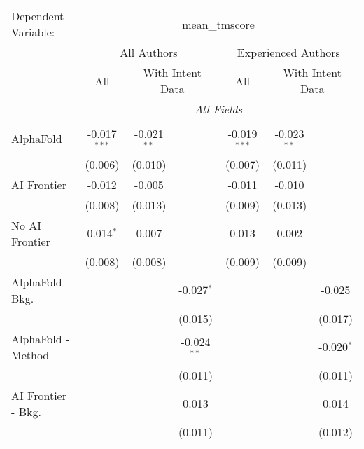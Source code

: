 \begingroup
\centering
\begin{tabular}{lcccccc}
   \tabularnewline \midrule \midrule
   Dependent Variable: & \multicolumn{6}{c}{mean\_tmscore}\\
 & \multicolumn{3}{c}{All Authors} & \multicolumn{3}{c}{Experienced Authors} \\
\cmidrule(lr){2-4} \cmidrule(lr){5-7}
 & \multicolumn{1}{c}{All} & \multicolumn{2}{c}{With Intent Data} & \multicolumn{1}{c}{All} & \multicolumn{2}{c}{With Intent Data} \\
\cmidrule(lr){2-2} \cmidrule(lr){3-4} \cmidrule(lr){5-5} \cmidrule(lr){6-7}
 & \multicolumn{6}{c}{\textit{All Fields}} \\ \\
   AlphaFold               & -0.017$^{***}$ & -0.021$^{**}$ &               & -0.019$^{***}$ & -0.023$^{**}$ &   \\   
                           & (0.006)        & (0.010)       &               & (0.007)        & (0.011)       &   \\   
   AI Frontier             & -0.012         & -0.005        &               & -0.011         & -0.010        &   \\   
                           & (0.008)        & (0.013)       &               & (0.009)        & (0.013)       &   \\   
   No AI Frontier          & 0.014$^{*}$    & 0.007         &               & 0.013          & 0.002         &   \\   
                           & (0.008)        & (0.008)       &               & (0.009)        & (0.009)       &   \\   
   AlphaFold - Bkg.        &                &               & -0.027$^{*}$  &                &               & -0.025\\   
                           &                &               & (0.015)       &                &               & (0.017)\\   
   AlphaFold - Method      &                &               & -0.024$^{**}$ &                &               & -0.020$^{*}$\\   
                           &                &               & (0.011)       &                &               & (0.011)\\   
   AI Frontier - Bkg.      &                &               & 0.013         &                &               & 0.014\\   
                           &                &               & (0.011)       &                &               & (0.012)\\   

\end{tabular}

